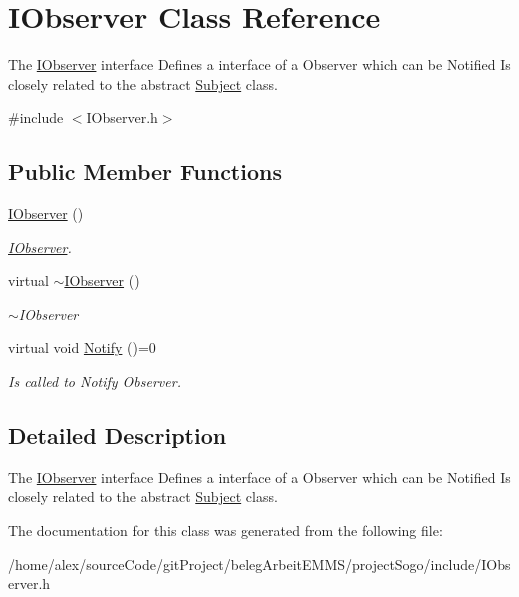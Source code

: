 \hypertarget{classIObserver}{\section{I\-Observer Class Reference}
\label{classIObserver}
}


The \hyperlink{classIObserver}{I\-Observer} interface Defines a interface of a Observer which can be Notified Is closely related to the abstract \hyperlink{classSubject}{Subject} class.  




{\ttfamily \#include $<$I\-Observer.\-h$>$}

\subsection*{Public Member Functions}
\begin{DoxyCompactItemize}
\item 
\hypertarget{classIObserver_a7e478961d27e1c605699e2b32fbdc29b}{\hyperlink{classIObserver_a7e478961d27e1c605699e2b32fbdc29b}{I\-Observer} ()}\label{classIObserver_a7e478961d27e1c605699e2b32fbdc29b}

\begin{DoxyCompactList}\small\item\em \hyperlink{classIObserver}{I\-Observer}. \end{DoxyCompactList}\item 
\hypertarget{classIObserver_afdfe9e2ebd9aa794142968de574daa9a}{virtual \hyperlink{classIObserver_afdfe9e2ebd9aa794142968de574daa9a}{$\sim$\-I\-Observer} ()}\label{classIObserver_afdfe9e2ebd9aa794142968de574daa9a}

\begin{DoxyCompactList}\small\item\em $\sim$\-I\-Observer \end{DoxyCompactList}\item 
\hypertarget{classIObserver_ad46021c61f1fa2126078f33783adc727}{virtual void \hyperlink{classIObserver_ad46021c61f1fa2126078f33783adc727}{Notify} ()=0}\label{classIObserver_ad46021c61f1fa2126078f33783adc727}

\begin{DoxyCompactList}\small\item\em Is called to Notify Observer. \end{DoxyCompactList}\end{DoxyCompactItemize}


\subsection{Detailed Description}
The \hyperlink{classIObserver}{I\-Observer} interface Defines a interface of a Observer which can be Notified Is closely related to the abstract \hyperlink{classSubject}{Subject} class. 

The documentation for this class was generated from the following file\-:\begin{DoxyCompactItemize}
\item 
/home/alex/source\-Code/git\-Project/beleg\-Arbeit\-E\-M\-M\-S/project\-Sogo/include/I\-Observer.\-h\end{DoxyCompactItemize}
